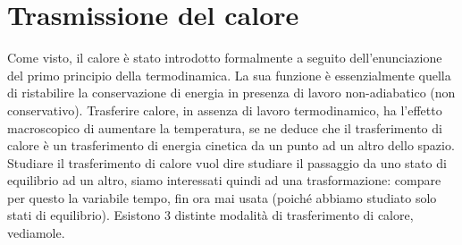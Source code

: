 \documentclass[10pt,a4paper]{article}
\begin{document}
\section{Trasmissione del calore}
Come visto, il calore è stato introdotto formalmente a seguito dell'enunciazione del primo principio della termodinamica. La sua funzione è essenzialmente quella di ristabilire la conservazione di energia in presenza di lavoro non-adiabatico (non conservativo). Trasferire calore, in assenza di lavoro termodinamico, ha l'effetto macroscopico di aumentare la temperatura, se ne deduce che il trasferimento di calore è un trasferimento di energia cinetica da un punto ad un altro dello spazio. Studiare il trasferimento di calore vuol dire studiare il passaggio da uno stato di equilibrio ad un altro, siamo interessati quindi ad una trasformazione: compare per questo la variabile tempo, fin ora mai usata (poiché abbiamo studiato solo stati di equilibrio). Esistono 3 distinte modalità di trasferimento di calore, vediamole.
\end{document}
